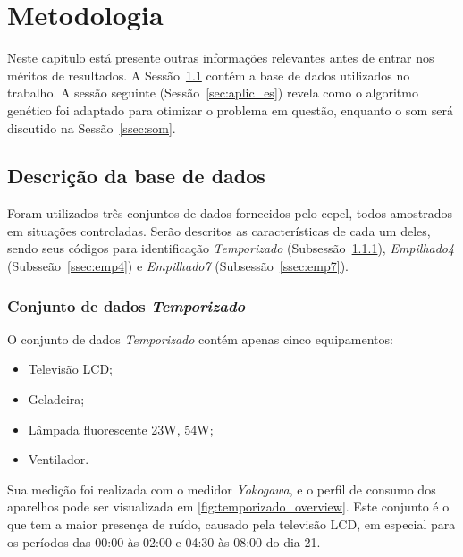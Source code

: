 \chapter{Metodologia}
\label{chap:metodologia}

Neste capítulo está presente outras informações relevantes antes de
entrar nos méritos de resultados. A Sessão~\ref{sec:base_de_dados}
contém a base de dados utilizados no trabalho. A sessão seguinte
(Sessão~\ref{sec:aplic_es}) revela como o algoritmo genético foi
adaptado para otimizar o problema em questão, enquanto o \acs{som}
será discutido na Sessão~\ref{ssec:som}.

\section{Descrição da base de dados}
\label{sec:base_de_dados}

Foram utilizados três conjuntos de dados fornecidos pelo \acs{cepel},
todos amostrados em situações controladas. Serão descritos as
características de cada um deles, sendo seus códigos para
identificação \emph{Temporizado} (Subsessão~\ref{ssec:temp}),
\emph{Empilhado4} (Subsseão~\ref{ssec:emp4}) e \emph{Empilhado7}
(Subsessão~\ref{ssec:emp7}).

\subsection{Conjunto de dados \emph{Temporizado}}
\label{ssec:temp}

\FloatBarrier
O conjunto de dados \emph{Temporizado} contém apenas cinco
equipamentos:

\begin{itemize}
\item Televisão LCD;
\item Geladeira;
\item Lâmpada fluorescente 23W, 54W;
\item Ventilador.
\end{itemize}

Sua medição foi realizada com o medidor \emph{Yokogawa}, e o perfil de
consumo dos aparelhos pode ser visualizada em
\ref{fig:temporizado_overview}.
Este conjunto é o que tem a maior presença de ruído, causado pela
televisão LCD, em especial para os períodos das 00:00 às 02:00 e 04:30
às 08:00 do dia 21.

